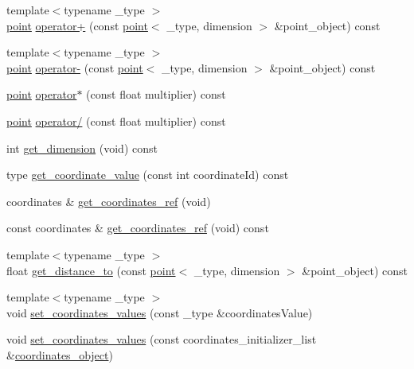 \begin{DoxyCompactItemize}
\item 
{\footnotesize template$<$typename \-\_\-type $>$ }\\\hyperlink{classxstd_1_1point}{point} \hyperlink{classxstd_1_1point_aae13ce0401101be7b26121f8be146f4b}{operator+} (const \hyperlink{classxstd_1_1point}{point}$<$ \-\_\-type, dimension $>$ \&point\-\_\-object) const 
\item 
{\footnotesize template$<$typename \-\_\-type $>$ }\\\hyperlink{classxstd_1_1point}{point} \hyperlink{classxstd_1_1point_ad1af00d4517e769e7da57cd26732a6ab}{operator-\/} (const \hyperlink{classxstd_1_1point}{point}$<$ \-\_\-type, dimension $>$ \&point\-\_\-object) const 
\item 
\hyperlink{classxstd_1_1point}{point} \hyperlink{classxstd_1_1point_ac777d5594b34c30fe27bcd549ef89be4}{operator$\ast$} (const float multiplier) const 
\item 
\hyperlink{classxstd_1_1point}{point} \hyperlink{classxstd_1_1point_aa96d22aaf0a1687325dadaa832740c3e}{operator/} (const float multiplier) const 
\item 
int \hyperlink{classxstd_1_1point_a766d0887be589b7448696e0c0b00d557}{get\-\_\-dimension} (void) const 
\item 
type \hyperlink{classxstd_1_1point_ae0363f79e01bb646555c51dfd99444ca}{get\-\_\-coordinate\-\_\-value} (const int coordinate\-Id) const 
\item 
coordinates \& \hyperlink{classxstd_1_1point_a812c6e9c6b5e329897fbab3ccce407e7}{get\-\_\-coordinates\-\_\-ref} (void)
\item 
const coordinates \& \hyperlink{classxstd_1_1point_aa6910f3a870a3844003ed1fa77dab3b9}{get\-\_\-coordinates\-\_\-ref} (void) const 
\item 
{\footnotesize template$<$typename \-\_\-type $>$ }\\float \hyperlink{classxstd_1_1point_a1926a1a02d788b584e7e994edb956d61}{get\-\_\-distance\-\_\-to} (const \hyperlink{classxstd_1_1point}{point}$<$ \-\_\-type, dimension $>$ \&point\-\_\-object) const 
\item 
{\footnotesize template$<$typename \-\_\-type $>$ }\\void \hyperlink{classxstd_1_1point_a468d82213633b70cb8c01f97838e6d49}{set\-\_\-coordinates\-\_\-values} (const \-\_\-type \&coordinates\-Value)
\item 
void \hyperlink{classxstd_1_1point_a239dbdfe4d96a38b9eacd76e972897c4}{set\-\_\-coordinates\-\_\-values} (const coordinates\-\_\-initializer\-\_\-list \&\hyperlink{classxstd_1_1point_a6ee0acdc7f3fdd004426279d0d7963e6}{coordinates\-\_\-object})

\end{DoxyCompactItemize}
